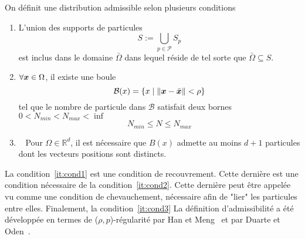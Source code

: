 \begin{definition}
    On définit une distribution admissible selon plusieurs conditions
    \begin{enumerate}
        \item L'union des supports de particules~\label{it:cond1}
              \begin{equation*}
                  S:= \bigcup_{p \in \mathcal P} S_p
              \end{equation*}
              est inclus dans le domaine $\bar \Omega$ dans lequel réside de tel sorte que $\bar \Omega	\subseteq S$.
        \item $\forall \bm{x} \in \Omega$, il existe une boule~\label{it:cond2}
              \begin{equation*}
                  \mathcal B(x) = \{x \mid \|\bm{x} - \bar {\bm{x}}\| < \rho\}
              \end{equation*}tel que le nombre de particule dans $\mathcal B$ satisfait deux bornes $0 < N_{min} < N_{max} < \inf$
              \begin{equation*}
                  N_{min} \leq N \leq N_{max}
              \end{equation*}%
              \item~\label{it:cond3} Pour $\Omega \in \mathbb R^d$, il est nécessaire que $B(x)$ admette au moins $d+1$ particules dont les vecteurs positions sont distincts.%
    \end{enumerate}
\end{definition}

La condition~\ref{it:cond1} est une condition de recouvrement. Cette dernière est une condition nécessaire de la condition~\ref{it:cond2}. Cette dernière peut être appelée vu comme une condition de chevauchement, nécessaire afin de "lier" les particules entre elles. Finalement, la condition~\ref{it:cond3}
La définition d'admissibilité a été développée en termes de ($\rho, p$)-régularité par Han et Meng~\cite{HAN20016157} et par Duarte et Oden~\cite{duarte1996hp}.

